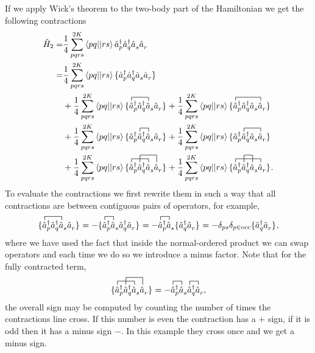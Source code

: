 \documentclass[../Main/chem532-notes.tex]{subfiles}
\begin{document}
If we apply Wick's theorem to the two-body part of the Hamiltonian we get the following contractions
\begin{equation}
\begin{split}
\hat{H}_2 =& \frac{1}{4} \sum_{pqrs}^{2K} \aphystei{pq}{rs} \cop{p}\cop{q}\aop{s}\aop{r} \\
=& \frac{1}{4} \sum_{pqrs}^{2K} \aphystei{pq}{rs} \no{\cop{p}\cop{q}\aop{s}\aop{r}} \\
&+ 
\frac{1}{4} \sum_{pqrs}^{2K} \aphystei{pq}{rs}
\no{\contraction{}{\hat{a}}{_{p}\cop{q}}{\hat{a}}
\cop{p}\cop{q}\aop{s}\aop{r}}
+
\frac{1}{4} \sum_{pqrs}^{2K} \aphystei{pq}{rs}
\no{\contraction{}{\hat{a}}{_{p}\cop{q}\aop{s}}{\hat{a}}
\cop{p}\cop{q}\aop{s}\aop{r}} \\
&+ 
\frac{1}{4} \sum_{pqrs}^{2K} \aphystei{pq}{rs}
\no{\contraction{\cop{p}}{\hat{a}}{_{q}}{\hat{a}}
\cop{p}\cop{q}\aop{s}\aop{r}}
+ 
\frac{1}{4} \sum_{pqrs}^{2K} \aphystei{pq}{rs}
\no{\contraction{\cop{p}}{\hat{a}}{_{q}\aop{s}}{\hat{a}}
\cop{p}\cop{q}\aop{s}\aop{r}} \\
&+ 
\frac{1}{4} \sum_{pqrs}^{2K} \aphystei{pq}{rs}
\no{\contraction{}{\hat{a}}{_{p}\cop{q}}{\hat{a}}
\contraction[2ex]{\cop{p}}{\hat{a}}{_{q}\aop{s}}{\hat{a}}
\cop{p}\cop{q}\aop{s}\aop{r}}
+
\frac{1}{4} \sum_{pqrs}^{2K} \aphystei{pq}{rs}
\no{\contraction{}{\hat{a}}{_{p}\cop{q}\aop{s}}{\hat{a}}
\contraction[2ex]{\cop{p}}{\hat{a}}{_{q}}{\hat{a}}
\cop{p}\cop{q}\aop{s}\aop{r}}.
\end{split}
\end{equation}
To evaluate the contractions we first rewrite them in such a way that all contractions are between contiguous pairs of operators, for example,
\begin{equation}
\no{\contraction{}{\hat{a}}{_{p}\cop{q}}{\hat{a}}
\cop{p}\cop{q}\aop{s}\aop{r}}
=
-
\no{\contraction{}{\hat{a}}{_{p}}{\hat{a}}
\cop{p}\aop{s}\cop{q}\aop{r}}
=-
\contraction{}{\hat{a}}{_{p}}{\hat{a}}
\cop{p}\aop{s} \no{\cop{q}\aop{r}}
= -\delta_{ps} \delta_{p \in \mathrm{occ}} \no{\cop{q}\aop{r}},
\end{equation}
where we have used the fact that inside the normal-ordered product we can swap operators and each time we do so we introduce a minus factor.
Note that for the fully contracted term,
\begin{equation}
\no{\contraction{}{\hat{a}}{_{p}\cop{q}}{\hat{a}}
\contraction[2ex]{\cop{p}}{\hat{a}}{_{q}\aop{s}}{\hat{a}}
\cop{p}\cop{q}\aop{s}\aop{r}}
=
- \contraction{}{\hat{a}}{_{p}}{\hat{a}}
\contraction{\cop{p}\cop{q}}{\hat{a}}{_{s}}{\hat{a}}
\cop{p}\aop{s}\cop{q}\aop{r},
\end{equation}
the overall sign may be computed by counting the number of times the contractions line cross. If this number is even the contraction has a $+$ sign, if it is odd then it has a minus sign $-$. In this example they cross once and we get a minus sign.
\end{document}
